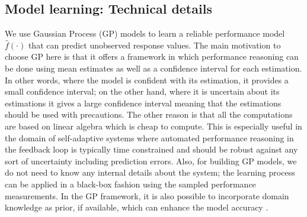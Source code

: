 \subsection{Model learning: Technical details}
\label{sec:gp}

We use Gaussian Process (GP) models to learn a reliable performance model $\hat{f}(\cdot)$ that can predict unobserved response values. The main motivation to choose GP here is that it offers a framework in which performance reasoning can be done using mean estimates as well as a confidence interval for each estimation. In other words, where the model is confident with its estimation, it provides a small confidence interval; on the other hand, where it is uncertain about its estimations it gives a large confidence interval meaning that the estimations should be used with precautions. The other reason is that all the computations are based on linear algebra which is cheap to compute. This is especially useful in the domain of self-adaptive systems where automated performance reasoning in the feedback loop is typically time constrained and should be robust against any sort of uncertainty including prediction errors. Also, for building GP models, we do not need to know any internal details about the system; the learning process can be applied in a black-box fashion using the sampled performance measurements. In the GP framework, it is also possible to incorporate domain knowledge as prior, if available, which can enhance the model accuracy \cite{jamshidi2016bo4co}.

